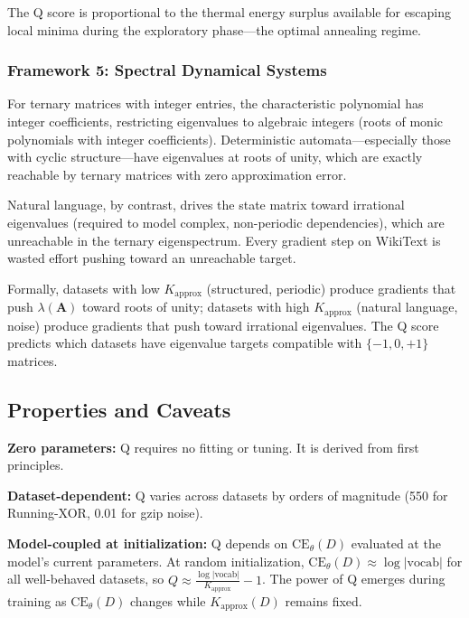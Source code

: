 \documentclass{article}
\begin{document}
The Q score is proportional to the thermal energy surplus available for escaping local minima during the exploratory phase---the optimal annealing regime.

\subsubsection{Framework 5: Spectral Dynamical Systems}

For ternary matrices with integer entries, the characteristic polynomial has integer coefficients, restricting eigenvalues to algebraic integers (roots of monic polynomials with integer coefficients). Deterministic automata---especially those with cyclic structure---have eigenvalues at roots of unity, which are exactly reachable by ternary matrices with zero approximation error.

Natural language, by contrast, drives the state matrix toward irrational eigenvalues (required to model complex, non-periodic dependencies), which are unreachable in the ternary eigenspectrum. Every gradient step on WikiText is wasted effort pushing toward an unreachable target.

Formally, datasets with low $K_{\mathrm{approx}}$ (structured, periodic) produce gradients that push $\lambda(\mathbf{A})$ toward roots of unity; datasets with high $K_{\mathrm{approx}}$ (natural language, noise) produce gradients that push toward irrational eigenvalues. The Q score predicts which datasets have eigenvalue targets compatible with $\{-1, 0, +1\}$ matrices.

\subsection{Properties and Caveats}

\textbf{Zero parameters:} Q requires no fitting or tuning. It is derived from first principles.

\textbf{Dataset-dependent:} Q varies across datasets by orders of magnitude (550 for Running-XOR, 0.01 for gzip noise).

\textbf{Model-coupled at initialization:} Q depends on $\mathrm{CE}_\theta(D)$ evaluated at the model's current parameters. At random initialization, $\mathrm{CE}_\theta(D) \approx \log|\mathrm{vocab}|$ for all well-behaved datasets, so $Q \approx \frac{\log|\mathrm{vocab}|}{K_{\mathrm{approx}}} - 1$. The power of Q emerges during training as $\mathrm{CE}_\theta(D)$ changes while $K_{\mathrm{approx}}(D)$ remains fixed.
\end{document}

